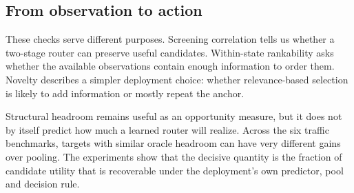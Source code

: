 \subsection{From observation to action}

These checks serve different purposes. Screening correlation tells us whether a
two-stage router can preserve useful candidates. Within-state rankability asks
whether the available observations contain enough information to order them.
Novelty describes a simpler deployment choice: whether relevance-based
selection is likely to add information or mostly repeat the anchor.

Structural headroom remains useful as an opportunity measure, but it does not
by itself predict how much a learned router will realize. Across the six traffic
benchmarks, targets with similar oracle headroom can have very different gains
over pooling. The experiments show that the decisive quantity is the fraction
of candidate utility that is recoverable under the deployment's own predictor,
pool and decision rule.
